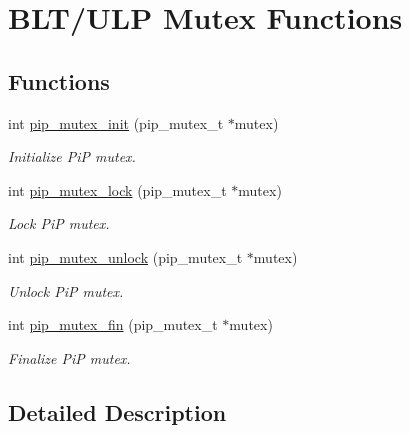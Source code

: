 \hypertarget{group__ulp-5-mutex}{\section{B\-L\-T/\-U\-L\-P Mutex Functions}
\label{group__ulp-5-mutex}
}
\subsection*{Functions}
\begin{DoxyCompactItemize}
\item 
int \hyperlink{group__ulp-5-mutex_gaff168395426838d385ad6720c9fb4184}{pip\-\_\-mutex\-\_\-init} (pip\-\_\-mutex\-\_\-t $\ast$mutex)
\begin{DoxyCompactList}\small\item\em Initialize Pi\-P mutex. \end{DoxyCompactList}\item 
int \hyperlink{group__ulp-5-mutex_ga14f77d2413590f58d7a45a3b56960c90}{pip\-\_\-mutex\-\_\-lock} (pip\-\_\-mutex\-\_\-t $\ast$mutex)
\begin{DoxyCompactList}\small\item\em Lock Pi\-P mutex. \end{DoxyCompactList}\item 
int \hyperlink{group__ulp-5-mutex_ga370bb79d84360fdb96169fc5cea789ee}{pip\-\_\-mutex\-\_\-unlock} (pip\-\_\-mutex\-\_\-t $\ast$mutex)
\begin{DoxyCompactList}\small\item\em Unlock Pi\-P mutex. \end{DoxyCompactList}\item 
int \hyperlink{group__ulp-5-mutex_ga884fae0413bd07dbdb5f3940129b7b20}{pip\-\_\-mutex\-\_\-fin} (pip\-\_\-mutex\-\_\-t $\ast$mutex)
\begin{DoxyCompactList}\small\item\em Finalize Pi\-P mutex. \end{DoxyCompactList}\end{DoxyCompactItemize}


\subsection{Detailed Description}


